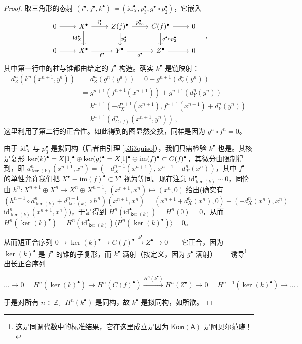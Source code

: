 \begin{proof}
	取三角形的态射 $(i^\bullet,j^\bullet,k^\bullet)\coloneqq (\text{id}_X^\bullet,p_3^\bullet,g^\bullet\circ p_2^\bullet)$，它嵌入
	\begin{equation*}
		\begin{tikzcd}
			0\arrow[r] & X^\bullet\arrow[r,"i_1^\bullet"]\arrow[d,"\text{id}_X^\bullet"'] & Z(f)^\bullet\arrow[r,"p_{23}^\bullet"]\arrow[d,"p_3^\bullet"] & C(f)^\bullet\arrow[r]\arrow[d,"g^\bullet\circ p_2^\bullet"] & 0 \\
			0\arrow[r] & X^\bullet\arrow[r,"f^\bullet"'] & Y^\bullet\arrow[r,"g^\bullet"'] & Z^\bullet\arrow[r] & 0
		\end{tikzcd}\quad,
	\end{equation*}
	其中第一行中的柱与锥都由给定的 $f^\bullet$ 构造。确实 $k^\bullet$ 是链映射：
	\begin{align*}
		d_Z^n(k^n(x^{n+1},y^n))&=d_Z^n(g^n(y^n))=0+g^{n+1}(d_Y^n(y^n))\\ 
		&=g^{n+1}(f^{n+1}(x^{n+1}))+g^{n+1}(d_Y^n(y^n))\\
		&=k^{n+1}(-d_X^{n+1}(x^{n+1}),f^{n+1}(x^{n+1})+d_Y^n(y^n))\\
		&=k^{n+1}(d_{C(f)}^n(x^{n+1},y^n))\,,
	\end{align*}
	这里利用了第二行的正合性。如此得到的图显然交换，同样是因为 $g^n\circ f^n=0$。
	
	由于 $\text{id}_X^\bullet$ 与 $p_3^\bullet$ 是拟同构（后者由引理 \ref{p3i3quiso}），我们只需检验 $k^\bullet$ 也是。其核是复形 $\ker(k)^\bullet = X[1]^\bullet\oplus \ker(g)^\bullet\break= X[1]^\bullet\oplus\text{im}(f)^\bullet\subset C(f)^\bullet$，其微分由限制得到，即 $d_{\ker(k)}^n(x^{n+1},x^n)=(-d_X^{n+1}(x^{n+1}),\,x^{n+1}+d_X^n(x^n))$，其中 $f^\bullet$ 的单性允许我们把 $X^\bullet\equiv\text{im}(f)^\bullet\subset Y^\bullet$ 视为等同。现在注意 $\text{id}_{\ker(k)}^\bullet\sim 0$，同伦由 $h^n:X^{n+1}\oplus X^n\rightarrow X^n\oplus X^{n-1},\, (x^{n+1},x^n)\mapsto (x^n,0)$ 给出\big(确实有 $(h^{n+1}\circ d_{\ker(k)}^n+d_{\ker(k)}^{n-1}\circ h^n)(x^{n+1},x^n)=(x^{n+1}+d_X^n(x^n),0)+(-d_X^n(x^n),x^n)=$ $\text{id}_{\ker(k)}^n(x^{n+1},x^n)$\big)，于是得到 $H^n(\text{id}_{\ker(k)}^\bullet)=H^n(0)=0$，从而 $H^n(\ker(k)^\bullet)=H^n(\text{id}_{\ker(k)}^\bullet)\langle H^n(\ker(k)^\bullet)\rangle=0$。
	
	从而短正合序列 $0\rightarrow\ker(k)^\bullet\rightarrow C(f)^\bullet\xrightarrow{k^\bullet} Z^\bullet\rightarrow 0$\break——它正合，因为 $\ker(k)^\bullet$ 是 $f^\bullet$ 的锥的子复形，而 $k^\bullet$ 满射（按定义，因为 $g^\bullet$ 满射）——诱导\footnote{这是同调代数中的标准结果，它在这里成立是因为 $\mathsf{Kom(A)}$ 是阿贝尔范畴！}出长正合序列
	\begin{small}\[
		...\rightarrow 0=H^n(\ker(k)^\bullet)\rightarrow H^n(C(f)^\bullet)\xrightarrow{H^n(k^\bullet)} H^n(Z^\bullet)\rightarrow 0=H^{n+1}(\ker(k)^\bullet)\rightarrow...\,.
		\]\end{small}
	\!\!于是对所有 $n\in\mathbb{Z}$，$H^n(k^\bullet)$ 是同构，故 $k^\bullet$ 是拟同构，如所欲。 
\end{proof}

